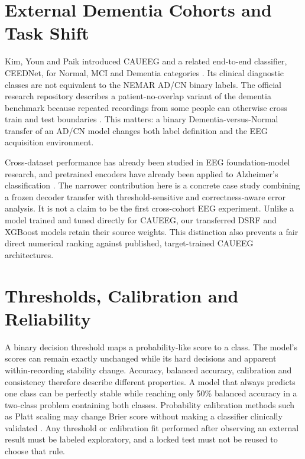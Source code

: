 \section{External Dementia Cohorts and Task Shift}
Kim, Youn and Paik introduced CAUEEG and a related end-to-end classifier, CEEDNet, for Normal, MCI and Dementia categories \cite{kim2023caueeg}. Its clinical diagnostic classes are not equivalent to the NEMAR AD/CN binary labels. The official research repository describes a patient-no-overlap variant of the dementia benchmark because repeated recordings from some people can otherwise cross train and test boundaries \cite{caueegofficial}. This matters: a binary Dementia-versus-Normal transfer of an AD/CN model changes both label definition and the EEG acquisition environment.

Cross-dataset performance has already been studied in EEG foundation-model research, and pretrained encoders have already been applied to Alzheimer's classification \cite{wang2026lead,xiong2026,liu2026compass}. The narrower contribution here is a concrete case study combining a frozen decoder transfer with threshold-sensitive and correctness-aware error analysis. It is not a claim to be the first cross-cohort EEG experiment. Unlike a model trained and tuned directly for CAUEEG, our transferred DSRF and XGBoost models retain their source weights. This distinction also prevents a fair direct numerical ranking against published, target-trained CAUEEG architectures.

\section{Thresholds, Calibration and Reliability}
A binary decision threshold maps a probability-like score to a class. The model's scores can remain exactly unchanged while its hard decisions and apparent within-recording stability change. Accuracy, balanced accuracy, calibration and consistency therefore describe different properties. A model that always predicts one class can be perfectly stable while reaching only 50\% balanced accuracy in a two-class problem containing both classes. Probability calibration methods such as Platt scaling may change Brier score without making a classifier clinically validated \cite{guo2017calibration}. Any threshold or calibration fit performed after observing an external result must be labeled exploratory, and a locked test must not be reused to choose that rule.

